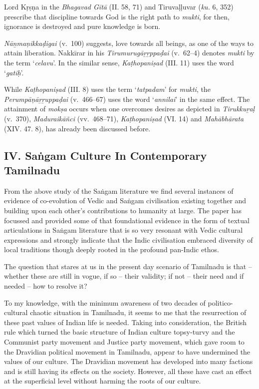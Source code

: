 Lord Kṛṣṇa in the \textit{Bhagavad Gītā} (II. 58, 71) and Tiruvaḷḷuvar (\textit{ku.} 6, 352) prescribe that discipline towards God is the right path to \textit{mukti}, for then, ignorance is destroyed and pure knowledge is born.

\textit{Nāṉmaṇikkaḍigai} (v.~100) suggests, love towards all beings, as one of the ways to attain liberation. Nakkīrar in his \textit{Tirumurugāṟṟppaḍai} (v.~62–4) denotes \textit{mukti} by the term ‘\textit{celavu}’. In the similar sense, \textit{Kaṭhopaniṣad} (III. 11) uses the word ‘\textit{gatiḥ}’.

While \textit{Kaṭhopaniṣad} (III. 8) uses the term ‘\textit{tatpadam}’ for \textit{mukti}, the \textit{Perumpāṇāṟṟuppaḍai} (v.~466–67) uses the word ‘\textit{annilai}’ in the same effect. The attainment of \textit{mokṣa} occurs when one overcomes desires as depicted in \textit{Tirukkuṟaḷ} (v.~370), \textit{Maduraikāñci} (vv.~468–71), \textit{Kaṭhopaniṣad} (VI. 14) and \textit{Mahābhārata} (XIV. 47. 8), has already been discussed before.


\subsection*{IV. Saṅgam Culture In Contemporary Tamilnadu}

\vskip -7.5pt

From the above study of the Saṅgam literature we find several instances of evidence of co-evolution of Vedic and Saṅgam civilisation existing together and building upon each other’s contributions to humanity at large. The paper has focussed and provided some of that foundational evidence in the form of textual articulations in Saṅgam literature that is so very resonant with Vedic cultural expressions and strongly indicate that the Indic civilisation embraced diversity of local traditions though deeply rooted in the profound pan-Indic ethos.

The question that stares at us in the present day scenario of Tamilnadu is that – whether these are still in vogue, if so – their validity; if not – their need and if needed – how to resolve it?

To my knowledge, with the minimum awareness of two decades of politico-cultural chaotic situation in Tamilnadu, it seems to me that the resurrection of these past values of Indian life is needed. Taking into consideration, the British rule which turned the basic structure of Indian culture topsy-turvy and the Communist party movement and Justice party movement, which gave room to the Dravidian political movement in Tamilnadu, appear to have undermined the values of our culture. The Dravidian movement has developed into many factions and is still having its effects on the society. However, all these have cast an effect at the superficial level without harming the roots of our culture.

